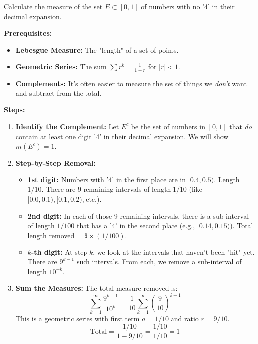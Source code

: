 \begin{exercise}
\label{analysis:2012:9}
Calculate the measure of the set $E \subset [0,1]$ of numbers with no '4' in their decimal expansion.
\end{exercise}

\begin{solution}
\textbf{Prerequisites:}
\begin{itemize}
    \item \textbf{Lebesgue Measure:} The "length" of a set of points.
    \item \textbf{Geometric Series:} The sum $\sum r^k = \frac{1}{1-r}$ for $|r| < 1$.
    \item \textbf{Complements:} It's often easier to measure the set of things we \textit{don't} want and subtract from the total.
\end{itemize}

\bigskip

\textbf{Steps:}
\begin{enumerate}
    \item \textbf{Identify the Complement:} Let $E^c$ be the set of numbers in $[0,1]$ that \textit{do} contain at least one digit '4' in their decimal expansion. We will show $m(E^c) = 1$.
    
    \item \textbf{Step-by-Step Removal:}
    \begin{itemize}
        \item \textbf{1st digit:} Numbers with '4' in the first place are in $[0.4, 0.5)$. Length = $1/10$. There are 9 remaining intervals of length $1/10$ (like $[0.0, 0.1), [0.1, 0.2)$, etc.).
        \item \textbf{2nd digit:} In each of those 9 remaining intervals, there is a sub-interval of length $1/100$ that has a '4' in the second place (e.g., $[0.14, 0.15)$). Total length removed = $9 \times (1/100)$.
        \item \textbf{$k$-th digit:} At step $k$, we look at the intervals that haven't been "hit" yet. There are $9^{k-1}$ such intervals. From each, we remove a sub-interval of length $10^{-k}$.
    \end{itemize}

    \item \textbf{Sum the Measures:} The total measure removed is:
    \[ \sum_{k=1}^\infty \frac{9^{k-1}}{10^k} = \frac{1}{10} \sum_{k=1}^\infty \left(\frac{9}{10}\right)^{k-1} \]
    This is a geometric series with first term $a = 1/10$ and ratio $r = 9/10$.
    \[ \text{Total} = \frac{1/10}{1 - 9/10} = \frac{1/10}{1/10} = 1 \]


\end{enumerate}
\end{solution}
